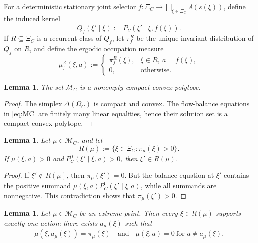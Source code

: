 \documentclass[12pt]{article}
\newtheorem{lemma}[theorem]{Lemma}
\theoremstyle{definition}
\newcommand{\1}{\mathbf{1}}
\newcommand{\cM}{\mathcal{M}}
\begin{document}
For a deterministic stationary joint selector
\(f:\Xi_C\to \bigsqcup_{\xi\in \Xi_C} A(s(\xi))\), define the induced kernel
\[
Q_f(\xi'\mid \xi):=P_C^0(\xi'\mid \xi,f(\xi)).
\]
If \(R\subseteq \Xi_C\) is a recurrent class of \(Q_f\), let \(\pi_f^R\) be the unique
invariant distribution of \(Q_f\) on \(R\), and define the ergodic occupation measure
\[
\mu_f^R(\xi,a):=
\begin{cases}
\pi_f^R(\xi), & \xi\in R,\ a=f(\xi),\\
0, & \text{otherwise}.
\end{cases}
\]

\begin{lemma}
\label{lem:MC-polytope}
The set \(\cM_C\) is a nonempty compact convex polytope.
\end{lemma}

\begin{proof}
The simplex \(\Delta(\Omega_C)\) is compact and convex.  The flow-balance equations in
\eqref{eq:MC} are finitely many linear equalities, hence their solution set is a compact
convex polytope.
\end{proof}

\begin{lemma}
\label{lem:support-closed2}
Let \(\mu\in \cM_C\), and let
\[
R(\mu):=\{\xi\in \Xi_C:\pi_\mu(\xi)>0\}.
\]
If \(\mu(\xi,a)>0\) and \(P_C^0(\xi'\mid \xi,a)>0\), then \(\xi'\in R(\mu)\).
\end{lemma}

\begin{proof}
If \(\xi'\notin R(\mu)\), then \(\pi_\mu(\xi')=0\).  But the balance equation at \(\xi'\)
contains the positive summand \(\mu(\xi,a)P_C^0(\xi'\mid \xi,a)\), while all summands are
nonnegative.  This contradiction shows that \(\pi_\mu(\xi')>0\).
\end{proof}

\begin{lemma}
\label{lem:extreme-deterministic2}
Let \(\mu\in \cM_C\) be an extreme point.  Then every \(\xi\in R(\mu)\) supports exactly
one action: there exists \(a_\mu(\xi)\) such that
\[
\mu(\xi,a_\mu(\xi))=\pi_\mu(\xi)
\quad\text{and}\quad
\mu(\xi,a)=0\ \text{for }a\neq a_\mu(\xi).
\]
\end{lemma}
\end{document}
